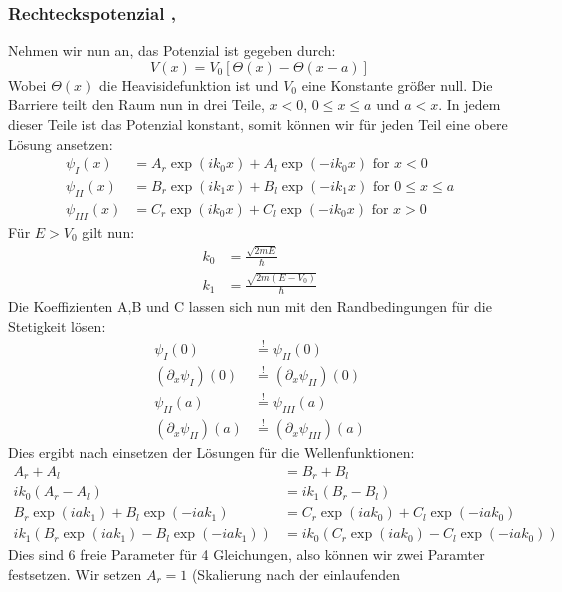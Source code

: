 \subsubsection{Rechteckspotenzial \cite{wolfgang2010experimentalphysik},
\cite{landau1991quantenmechanik} }
Nehmen wir nun an, das Potenzial ist gegeben durch:
\begin{equation}
    V(x) = V_0 \left [ \Theta(x) - \Theta(x-a) \right ] 
\end{equation}
Wobei $\Theta(x)$ die Heavisidefunktion ist und $V_0$ eine Konstante größer null.
Die Barriere teilt den Raum nun in drei Teile, $x<0$, $0\leqslant x\leqslant a$ und $a<x$.
In jedem dieser Teile ist das Potenzial konstant, somit können wir für jeden Teil eine
obere Lösung ansetzen:
\begin{align}
    \psi_I(x)    &= A_r \exp(ik_0x) + A_l  \exp(-ik_0x) \mbox{ for } x<0\\
    \psi_{II}(x) &= B_r \exp(ik_1x) + B_l  \exp(-ik_1x) \mbox{ for } 0 \leqslant x \leqslant a\\
    \psi_{III}(x)&= C_r \exp(ik_0x) + C_l  \exp(-ik_0x) \mbox{ for } x>0
\end{align}
Für $E>V_0$ gilt nun:
\begin{align}
    k_0 &= \frac{\sqrt{2mE}}{\hbar}\\
    k_1 &= \frac{\sqrt{2m(E-V_0)}}{\hbar}
\end{align}
Die Koeffizienten A,B und C lassen sich nun mit den Randbedingungen
für die Stetigkeit lösen:
\begin{align}
    \psi_I(0)&\overset{!}{=} \psi_{II}(0)\\
    (\partial_x\psi_I)(0)&\overset{!}{=} (\partial_x\psi_{II})(0)\\
    \psi_{II}(a)&\overset{!}{=} \psi_{III}(a)\\
    (\partial_x\psi_{II})(a)&\overset{!}{=} (\partial_x\psi_{III})(a)
\end{align}
Dies ergibt nach einsetzen der Lösungen für die Wellenfunktionen:
\begin{align}
  A_r + A_l &= B_r + B_l \\
  ik_0(A_r-A_l) &= ik_1(B_r-B_l)\\
  B_r\exp(iak_1)+B_l\exp(-iak_1)&=C_r \exp(iak_0)+C_l\exp(-iak_0)\\
  ik_1(B_r\exp(iak_1) - B_l\exp(-iak_1))&=ik_0(C_r\exp(iak_0)-C_l\exp(-iak_0))
\end{align}
Dies sind 6 freie Parameter für 4 Gleichungen, also können wir zwei 
Paramter festsetzen. Wir setzen $A_r =1$ (Skalierung nach der einlaufenden
